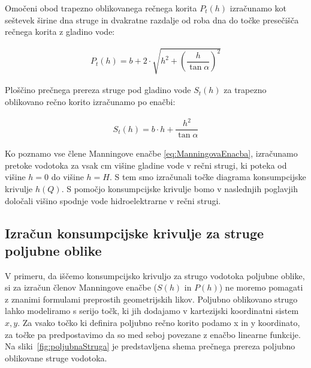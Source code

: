 \begin{enumerate}
	Omočeni obod trapezno oblikovanega rečnega korita $P_t(h)$ izračunamo kot seštevek širine dna struge in dvakratne razdalje od roba dna do točke presečišča rečnega korita z gladino vode:
	
	\begin{ceqn}
	\begin{align}
	P_{t}(h) = b + 2 \cdot \sqrt{h^2 + \left(\dfrac{h} {\tan\alpha} \right)^{2}}
	\end{align}
	\end{ceqn}
	
	Ploščino prečnega prereza struge pod gladino vode $S_t(h)$ za trapezno oblikovano rečno korito izračunamo po enačbi:
	\begin{ceqn}
	\begin{align}
	S_{t}(h) = b \cdot h + \dfrac{h^2}{\tan\alpha}
	\end{align}
	\end{ceqn}
	
\end{enumerate}



Ko poznamo vse člene Manningove enačbe \ref{eq:ManningovaEnacba}, izračunamo pretoke vodotoka za vsak cm višine gladine vode v rečni strugi, ki poteka od višine $h=0$ do višine $h=H$. S tem smo izračunali točke diagrama konsumpcijske krivulje $h(Q)$. S pomočjo konsumpcijske krivulje bomo v naslednjih poglavjih določali višino spodnje vode hidroelektrarne v rečni strugi.



\subsection{Izračun konsumpcijske krivulje za struge poljubne oblike} \label{sec:teorija_metodaPoljubnaOblika}


V primeru, da iščemo konsumpcijsko krivuljo za strugo vodotoka poljubne oblike, si za izračun členov Manningove enačbe ($S(h)$ in $P(h)$) ne moremo pomagati z znanimi formulami preprostih geometrijskih likov. Poljubno oblikovano strugo lahko modeliramo s serijo točk, ki jih dodajamo v kartezijski koordinatni sistem $x,y$. Za vsako točko ki definira poljubno rečno korito podamo x in y koordinato, za točke pa predpostavimo da so med seboj povezane z enačbo linearne funkcije. Na sliki~\ref{fig:poljubnaStruga} je predstavljena shema prečnega prereza poljubno oblikovane struge vodotoka.


